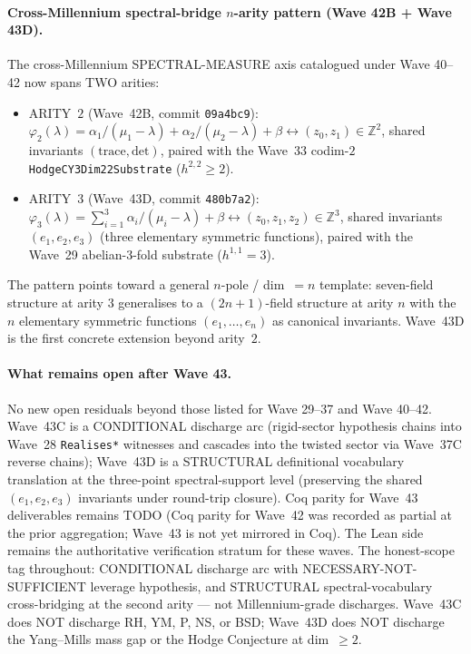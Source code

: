 \paragraph{Cross-Millennium spectral-bridge $n$-arity pattern
(Wave 42B + Wave 43D).} The cross-Millennium SPECTRAL-MEASURE axis
catalogued under Wave 40--42 now spans TWO arities:
\begin{itemize}
\item ARITY~$2$ (Wave~42B, commit \texttt{09a4bc9}):
  $\varphi_2(\lambda) = \alpha_1/(\mu_1 - \lambda) + \alpha_2/(\mu_2 -
  \lambda) + \beta \leftrightarrow (z_0, z_1) \in \mathbb{Z}^2$,
  shared invariants $(\mathrm{trace}, \mathrm{det})$, paired with the
  Wave~33 codim-$2$ \texttt{HodgeCY3Dim22Substrate} ($h^{2,2} \geq 2$).
\item ARITY~$3$ (Wave~43D, commit \texttt{480b7a2}):
  $\varphi_3(\lambda) = \sum_{i=1}^{3} \alpha_i/(\mu_i - \lambda) +
  \beta \leftrightarrow (z_0, z_1, z_2) \in \mathbb{Z}^3$,
  shared invariants $(e_1, e_2, e_3)$ (three elementary symmetric
  functions), paired with the Wave~29 abelian-3-fold substrate
  ($h^{1,1} = 3$).
\end{itemize}
The pattern points toward a general $n$-pole / dim~$=n$ template:
seven-field structure at arity $3$ generalises to a $(2n + 1)$-field
structure at arity $n$ with the $n$ elementary symmetric functions
$(e_1, \ldots, e_n)$ as canonical invariants. Wave~43D is the first
concrete extension beyond arity~$2$.

\paragraph{What remains open after Wave 43.} No new open residuals
beyond those listed for Wave 29--37 and Wave 40--42. Wave~43C is a
CONDITIONAL discharge arc (rigid-sector hypothesis chains into
Wave~28 \texttt{Realises*} witnesses and cascades into the twisted
sector via Wave~37C reverse chains); Wave~43D is a STRUCTURAL
definitional vocabulary translation at the three-point
spectral-support level (preserving the shared
$(e_1, e_2, e_3)$ invariants under round-trip closure). Coq parity
for Wave~43 deliverables remains TODO (Coq parity for Wave~42 was
recorded as partial at the prior aggregation; Wave~43 is not yet
mirrored in Coq). The Lean side remains the authoritative
verification stratum for these waves. The honest-scope tag
throughout: CONDITIONAL discharge arc with NECESSARY-NOT-SUFFICIENT
leverage hypothesis, and STRUCTURAL spectral-vocabulary
cross-bridging at the second arity --- not Millennium-grade
discharges. Wave~43C does NOT discharge RH, YM, P, NS, or BSD;
Wave~43D does NOT discharge the Yang--Mills mass gap or the Hodge
Conjecture at dim~$\geq 2$.

